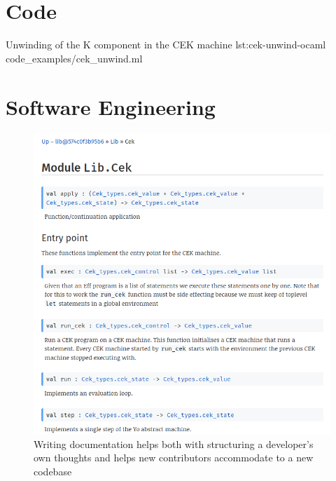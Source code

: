 \documentclass[%
    12pt,
    bibliography=toc,
    listof=leveldown,%
    oneside
]{book}
\begin{document}
\begin{appendices}
\chapter{Code}
\label{sec:code-snippets}
\setcounter{page}{1}

{Unwinding of the K component in the CEK machine}
{lst:cek-unwind-ocaml}
{code_examples/cek_unwind.ml}

\chapter{Software Engineering}

\begin{figure}
    \centering
    \includegraphics[width=35em]{screenshots/documentation.png}

    \caption{Writing documentation helps both with structuring a developer's own
    thoughts and helps new contributors accommodate to a new codebase}
    \label{fig:app-screenshot-documentation}
\end{figure}


\end{appendices}
\end{document}
